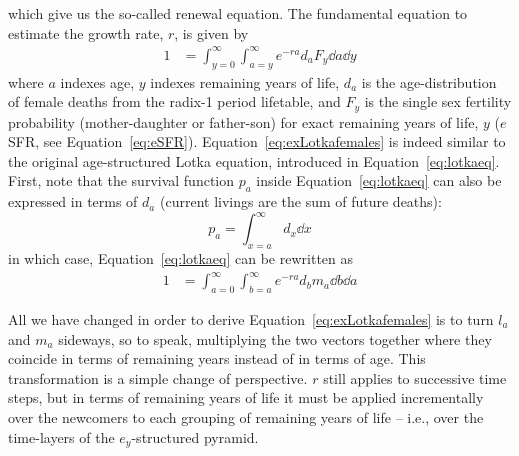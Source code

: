 which give us the so-called renewal equation. The fundamental equation to
estimate the growth rate, $r$, is given by
\begin{align}
\label{eq:exLotkafemales}
1 &= \int _{y=0}^\infty \int _{a=y}^\infty e^{-ra} d_{a} F_{y} \dd a \dd y
\end{align}
where $a$ indexes age, $y$ indexes remaining years of life,
$d_{a}$ is the age-distribution of female deaths from the radix-1 period
lifetable, and $F_{y}$ is the single sex fertility probability
(mother-daughter or father-son) for exact remaining years of
life, $y$ ($e$SFR, see Equation~\eqref{eq:eSFR}).
Equation~\eqref{eq:exLotkafemales} is indeed similar to the original
age-structured Lotka equation, introduced in Equation~\eqref{eq:lotkaeq}. First, note that the survival function $p_a$
inside Equation~\eqref{eq:lotkaeq} can also be expressed in terms of
$d_a$ (current livings are the sum of future deaths):
\begin{equation}
p_a = \int _{x = a} ^\infty d_x \dd x
\end{equation}
in which case, Equation~\ref{eq:lotkaeq} can be rewritten as
\begin{align}
\label{eq:lotkadx}
1 &= \int _{a=0}^\infty \int _{b = a}^\infty e^{-ra} d_b m_a \dd b \dd a
\end{align}

All we have changed in order to derive Equation~\eqref{eq:exLotkafemales}
is to turn $l_a$ and $m_a$ sideways, so to speak, multiplying the two vectors
together where they coincide in terms of remaining years instead of in terms of age. This
transformation is a simple change of perspective. $r$ still applies to
successive time steps, but in terms of remaining years of life it must be applied incrementally 
over the newcomers to
each grouping of remaining years of life -- i.e., over the time-layers of the
$e_y$-structured pyramid.
